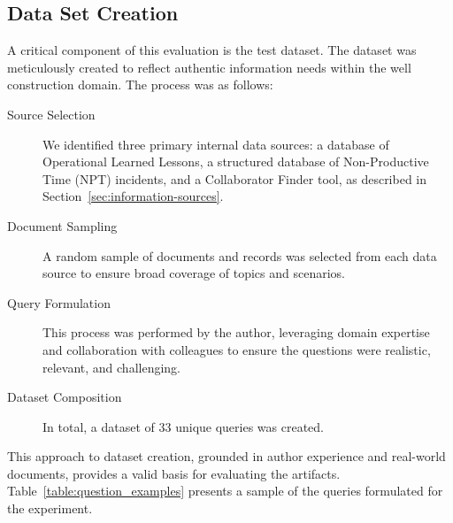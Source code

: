             
        \subsection{Data Set Creation}

            A critical component of this evaluation is the test dataset. The dataset was meticulously created to reflect authentic information needs within the well construction domain. The process was as follows:

            \begin{description}
                \item[Source Selection] We identified three primary internal data sources: a database of Operational Learned Lessons, a structured database of Non-Productive Time (NPT) incidents, and a Collaborator Finder tool, as described in Section~\ref{sec:information-sources}.
                \item[Document Sampling] A random sample of documents and records was selected from each data source to ensure broad coverage of topics and scenarios.
                \item[Query Formulation] This process was performed by the author, leveraging domain expertise and collaboration with colleagues to ensure the questions were realistic, relevant, and challenging.
                \item[Dataset Composition] In total, a dataset of 33 unique queries was created. 
            \end{description}

            This approach to dataset creation, grounded in author experience and real-world documents, provides a valid basis for evaluating the artifacts. Table~\ref{table:question_examples} presents a sample of the queries formulated for the experiment.


